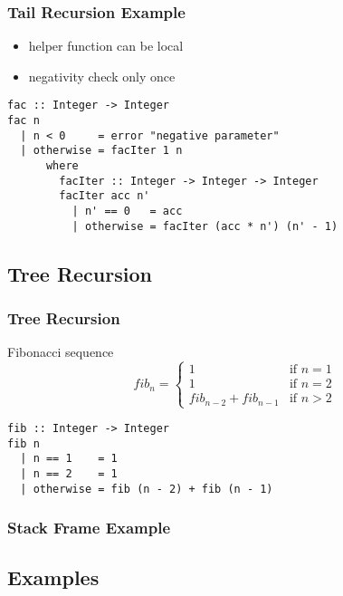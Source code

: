 \documentclass[dvipsnames]{beamer}
\theoremstyle{plain}
\begin{document}
\begin{frame}[fragile]
  \frametitle{Tail Recursion Example}

  \begin{itemize}
    \item helper function can be local
    \item negativity check only once
  \end{itemize}

  \begin{lstlisting}
fac :: Integer -> Integer
fac n
  | n < 0     = error "negative parameter"
  | otherwise = facIter 1 n
      where
        facIter :: Integer -> Integer -> Integer
        facIter acc n'
          | n' == 0   = acc
          | otherwise = facIter (acc * n') (n' - 1)
  \end{lstlisting}
\end{frame}

\subsection{Tree Recursion}

\begin{frame}[fragile]
  \frametitle{Tree Recursion}

  \begin{exampleblock}{Fibonacci sequence}
    \[
      fib_n =
        \begin{cases}
          1                     & \mbox{if } n = 1\\
          1                     & \mbox{if } n = 2\\
          fib_{n-2} + fib_{n-1} & \mbox{if } n > 2
        \end{cases}
    \]

    \begin{lstlisting}
fib :: Integer -> Integer
fib n
  | n == 1    = 1
  | n == 2    = 1
  | otherwise = fib (n - 2) + fib (n - 1)
    \end{lstlisting}
  \end{exampleblock}
\end{frame}

\begin{frame}[fragile]
  \frametitle{Stack Frame Example}

  \begin{center}
  \end{center}
\end{frame}

\subsection{Examples}
\end{document}
